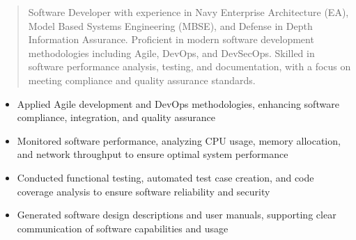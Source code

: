 



\makecvheader

\begin{quote}
  \noindent
  Software Developer with experience in Navy Enterprise Architecture (EA), Model Based Systems Engineering (MBSE), and Defense in Depth Information Assurance. Proficient in modern software development methodologies including Agile, DevOps, and DevSecOps. Skilled in software performance analysis, testing, and documentation, with a focus on meeting compliance and quality assurance standards.
\end{quote}

\par\smallskip
\noindent
\begin{minipage}{20cm}
  \begin{minipage}{9.75cm}
    \begin{itemize}
      \item Applied Agile development and DevOps methodologies, enhancing software compliance, integration, and quality assurance
      \item Monitored software performance, analyzing CPU usage, memory allocation, and network throughput to ensure optimal system performance
    \end{itemize}
  \end{minipage}
  \hfill
  \begin{minipage}{9.75cm}
    \begin{itemize}
      \item Conducted functional testing, automated test case creation, and code coverage analysis to ensure software reliability and security
      \item Generated software design descriptions and user manuals, supporting clear communication of software capabilities and usage
    \end{itemize}
  \end{minipage}
\end{minipage}
\par\smallskip
\divider

